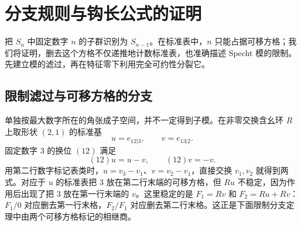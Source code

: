 \section{分支规则与钩长公式的证明}
\label{b5:sec:0605}

把 \(S_n\) 中固定数字 \(n\) 的子群识别为 \(S_{n-1}\)。在标准表中，\(n\) 只能占据可移方格；我们将证明，删去这个方格不仅递推地计数标准表，也准确描述 Specht 模的限制。先建立模的滤过，再在特征零下利用完全可约性分裂它。

\subsection{限制滤过与可移方格的分支}
\label{b5:subsec:0605:01}

单独按最大数字所在的角张成子空间，并不一定得到子模。在非零交换含幺环 \(R\) 上取形状 \((2,1)\) 的标准基
\[
	u=e_{12|3},\qquad v=e_{13|2}.
\]
固定数字 \(3\) 的换位 \((12)\) 满足
\[
	(12)u=u-v,\qquad (12)v=-v.
\]
用第二行数字标记表类时，\(u=v_3-v_1\)、\(v=v_2-v_1\)，直接交换 \(v_1,v_2\) 就得到两式。对应于 \(u\) 的标准表把 \(3\) 放在第二行末端的可移方格，但 \(Ru\) 不稳定，因为作用后出现了把 \(3\) 放在第一行末端的 \(v\)。这里稳定的是 \(F_1=Rv\) 和 \(F_2=Ru+Rv\)：\(F_1/0\) 对应删去第一行末格，\(F_2/F_1\) 对应删去第二行末格。这正是下面限制分支定理中由两个可移方格标记的相继商。

